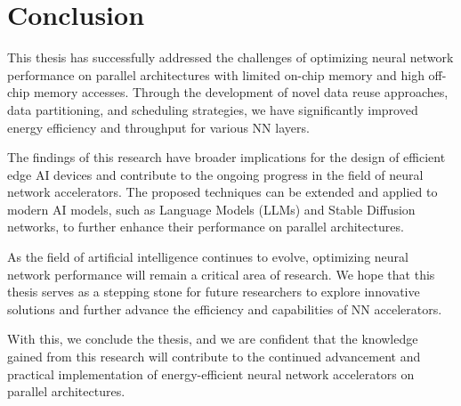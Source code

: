 \section{Conclusion}
This thesis has successfully addressed the challenges of optimizing neural network performance on parallel architectures with limited on-chip memory and high off-chip memory accesses. Through the development of novel data reuse approaches, data partitioning, and scheduling strategies, we have significantly improved energy efficiency and throughput for various NN layers.

The findings of this research have broader implications for the design of efficient edge AI devices and contribute to the ongoing progress in the field of neural network accelerators. The proposed techniques can be extended and applied to modern AI models, such as Language Models (LLMs) and Stable Diffusion networks, to further enhance their performance on parallel architectures.

As the field of artificial intelligence continues to evolve, optimizing neural network performance will remain a critical area of research. We hope that this thesis serves as a stepping stone for future researchers to explore innovative solutions and further advance the efficiency and capabilities of NN accelerators.

With this, we conclude the thesis, and we are confident that the knowledge gained from this research will contribute to the continued advancement and practical implementation of energy-efficient neural network accelerators on parallel architectures.